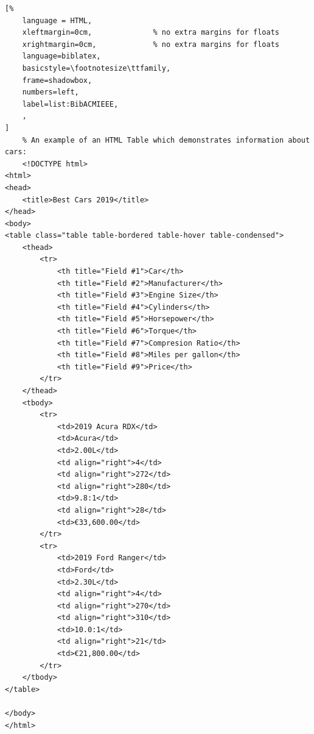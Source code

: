 \begin{lstlisting}[%
    language = HTML,
    xleftmargin=0cm,              % no extra margins for floats
    xrightmargin=0cm,             % no extra margins for floats
    language=biblatex,
    basicstyle=\footnotesize\ttfamily,
    frame=shadowbox,
    numbers=left,
    label=list:BibACMIEEE,
    ,
]
    % An example of an HTML Table which demonstrates information about cars:
    <!DOCTYPE html>
<html>
<head>
	<title>Best Cars 2019</title>
</head>
<body>
<table class="table table-bordered table-hover table-condensed">
	<thead>
		<tr>
			<th title="Field #1">Car</th>
			<th title="Field #2">Manufacturer</th>
			<th title="Field #3">Engine Size</th>
			<th title="Field #4">Cylinders</th>
			<th title="Field #5">Horsepower</th>
			<th title="Field #6">Torque</th>
			<th title="Field #7">Compresion Ratio</th>
			<th title="Field #8">Miles per gallon</th>
			<th title="Field #9">Price</th>
		</tr>
	</thead>
	<tbody>
		<tr>
			<td>2019 Acura RDX</td>
			<td>Acura</td>
			<td>2.00L</td>
			<td align="right">4</td>
			<td align="right">272</td>
			<td align="right">280</td>
			<td>9.8:1</td>
			<td align="right">28</td>
			<td>€33,600.00</td>
		</tr>
		<tr>
			<td>2019 Ford Ranger</td>
			<td>Ford</td>
			<td>2.30L</td>
			<td align="right">4</td>
			<td align="right">270</td>
			<td align="right">310</td>
			<td>10.0:1</td>
			<td align="right">21</td>
			<td>€21,800.00</td>
		</tr>
	</tbody>
</table>

</body>
</html>

\end{lstlisting}

